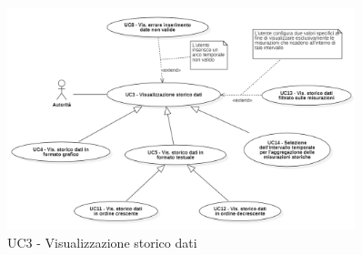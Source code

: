 

\begin{figure}[H]
    \centering
    \includegraphics[width=0.9\textwidth]{../Images/uc3.png}
    \caption{UC3 - Visualizzazione storico dati }
    \label{fig:UC3}
\end{figure}
















